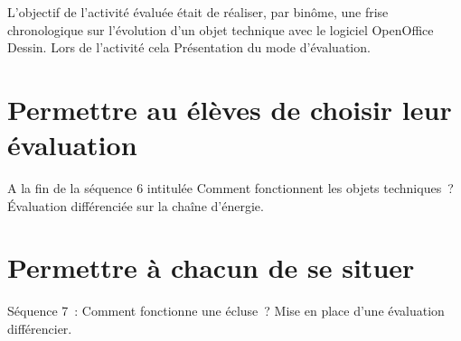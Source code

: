 L'objectif de l'activité évaluée était de réaliser, par binôme, une frise chronologique sur l'évolution d'un objet technique avec le logiciel OpenOffice Dessin.
Lors de l'activité  cela  
Présentation du mode d'évaluation.

\section{Permettre au élèves de choisir leur évaluation}

A la fin de la séquence 6 intitulée \og Comment fonctionnent les objets techniques~?\fg
Évaluation différenciée sur la chaîne d'énergie.


\section{Permettre à chacun de se situer }
Séquence 7~: Comment fonctionne une écluse~?
Mise en place d'une évaluation différencier.



